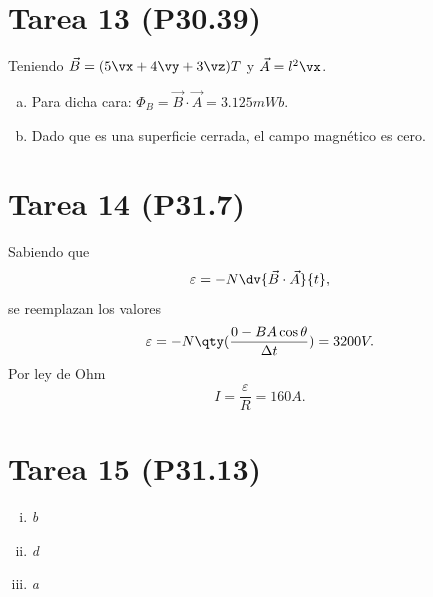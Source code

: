 \section*{Tarea 13 (P30.39)}

Teniendo $\vec{B} = (5\vx + 4\vy + 3\vz)T$ y $\vec{A} = l^2 \vx$.
\begin{enumerate}[a)]
	\item Para dicha cara: $\Phi _B = \vec{B} \cdot \vec{A} = \boxed{3.125mWb}$.
	\item Dado que es una superficie cerrada, el campo magnético es cero.
\end{enumerate}

































\section*{Tarea 14 (P31.7)}

Sabiendo que
	$$ \varepsilon = -N \dv{\vec{B} \cdot \vec{A}}{t}, $$
se reemplazan los valores
	$$ \varepsilon = -N \qty(\frac{0 - BA\cos{\theta}}{\Delta t}) = 3200V. $$
Por ley de Ohm
	$$ \boxed{I = \frac{\varepsilon}{R} = 160A.} $$





























\section*{Tarea 15 (P31.13)}

\begin{enumerate}[i)]
	\item \textit{b}
	\item \textit{d}
	\item \textit{a}
\end{enumerate}
















